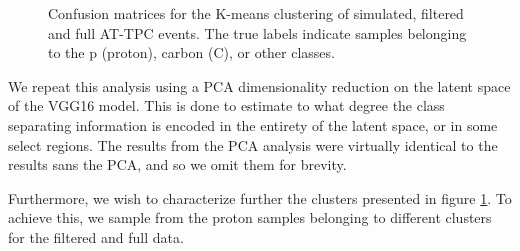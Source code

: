 \documentclass[preprint,12pt]{elsarticle}
\begin{document}
\begin{figure}
\centering

	\hspace{-1cm}
	\hspace{-1cm}
\caption[Pre-trained network - confusion matrices]{Confusion matrices for the K-means clustering of simulated, filtered and full AT-TPC events. The true labels indicate samples belonging to the p (proton), carbon (C), or other classes. }\label{fig:clster_confmat}
\end{figure}

We repeat this analysis using a PCA dimensionality reduction on the latent space of the VGG16 model. This is done to estimate to what degree the class separating information is encoded in the entirety of the latent space, or in some select regions. The results from the PCA analysis were virtually identical to the results sans the PCA, and so we omit them for brevity. 

Furthermore, we wish to characterize further the clusters presented in figure \ref{fig:clster_confmat}. To achieve this, we sample from the proton samples belonging to different clusters for the filtered and full data.
\end{document}
